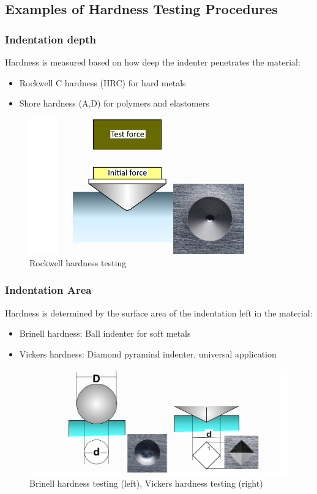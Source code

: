 \documentclass{article}
\begin{document}
\subsection{Examples of Hardness Testing Procedures}
\subsubsection{Indentation depth}
Hardness is measured based on how deep the indenter penetrates the material: 
\begin{itemize}
  \item Rockwell C hardness (HRC) for hard metals
  \item Shore hardness (A,D) for polymers and elastomers
\end{itemize}

\begin{figure}[ht!]
  \centering
  \includegraphics[width=.6\textwidth]{media/Rockwell_hardness.png}
  \caption*{Rockwell hardness testing}
\end{figure}

\subsubsection{Indentation Area}
Hardness is determined by the surface area of the indentation left in the material:
\begin{itemize}
  \item Brinell hardness: Ball indenter for soft metals
  \item Vickers hardness: Diamond pyramind indenter, universal application
\end{itemize}

\begin{figure}[ht!]
  \centering
  \includegraphics[width=.6\textwidth]{media/area_hardness.png}
  \caption*{Brinell hardness testing (left), Vickers hardness testing (right)}
\end{figure}
\end{document}
